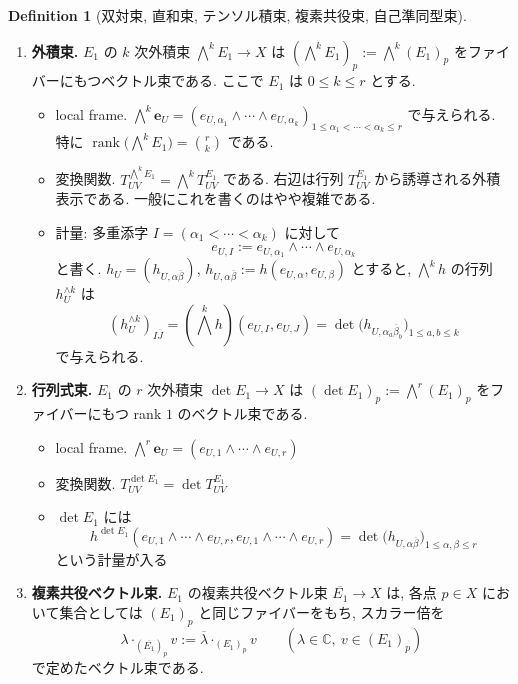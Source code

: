 \documentclass[dvipdfmx,a4paper,11pt]{article} %
\theoremstyle{definition}
\newtheorem{defn}[thm]{Definition}
\theoremstyle{remark}
\numberwithin{equation}{section}
\begin{document}
\begin{defn}[双対束, 直和束, テンソル積束, 複素共役束, 自己準同型束]
\begin{enumerate}
\begin{itemize}
\[\]
という計量が入る.
\end{itemize}
\item \textbf{外積束.} \(E_1\) の \(k\) 次外積束 \(\bigwedge^k E_1\to X\) は
\(
(\bigwedge^k E_1)_p:=\bigwedge^k (E_1)_p
\)
をファイバーにもつベクトル束である. ここで \(E_1\) は \(0\leq k\leq r\) とする.
\begin{itemize}
\item local frame. \(
\bigwedge^k\mathbf{e}_U=
(e_{U,\alpha_1}\wedge\cdots\wedge e_{U,\alpha_k})_{1\leq \alpha_1<\cdots<\alpha_k\leq r}
\)
で与えられる. 特に \(\operatorname{rank}\bigl(\bigwedge^k E_1\bigr)=\binom{r}{k}\) である.
\item 変換関数. \(T^{\bigwedge^k E_1}_{UV}=\bigwedge^k T^{E_1}_{UV}
\)
である. 右辺は行列 \(T^{E_1}_{UV}\) から誘導される外積表示である. 一般にこれを書くのはやや複雑である.
\item 計量: 多重添字 \(I=(\alpha_1<\cdots<\alpha_k)\) に対して
\[
e_{U,I}:=e_{U,\alpha_1}\wedge\cdots\wedge e_{U,\alpha_k}
\]
と書く. \(h_U=(h_{U,\alpha\overline{\beta}})\), \(h_{U,\alpha\overline{\beta}}:=h(e_{U,\alpha},e_{U,\beta})\) とすると, \(\bigwedge^k h\) の行列 \(h_U^{\wedge k}\) は
\[
(h_U^{\wedge k})_{I\overline J}
=
(\bigwedge^k h)(e_{U,I},e_{U,J})
=
\det\bigl(h_{U,\alpha_a\overline{\beta}_b}\bigr)_{1\leq a,b\leq k}
\]
で与えられる. 
\end{itemize}
\item \textbf{行列式束.} \(E_1\) の \(r\) 次外積束 \(\det E_1\to X\) は
\(
(\det E_1)_p:=\bigwedge^r  (E_1)_p
\)
をファイバーにもつ rank \(1\) のベクトル束である.
\begin{itemize}
\item local frame. \(
\bigwedge^r \mathbf{e}_U=
(e_{U, 1}\wedge\cdots\wedge e_{U, r})
\)
\item 変換関数. \(T^{\det E_1}_{UV}=\det T^{E_1}_{UV}
\)
\item \(\det E_1\) には
\[
h^{\det E_1}(e_{U, 1}\wedge\cdots\wedge e_{U, r}, e_{U, 1}\wedge\cdots\wedge e_{U, r})
= \det\bigl(h_{U,\alpha\overline{\beta}}\bigr)_{1\leq \alpha,\beta\leq r}
\]
という計量が入る
\end{itemize}
\item \textbf{複素共役ベクトル束.} \(E_1\) の複素共役ベクトル束 \(\overline{E_1}\to X\) は, 各点 \(p\in X\) において集合としては \((E_1)_p\) と同じファイバーをもち, スカラー倍を
\[
\lambda\cdot_{(\overline{E_1})_p}v:=\overline{\lambda}\cdot_{(E_1)_p}v
\qquad (\lambda\in\mathbb{C},\ v\in (E_1)_p)
\]
で定めたベクトル束である.
\begin{itemize}

\end{itemize}
\end{enumerate}
\end{defn}
\end{document}
